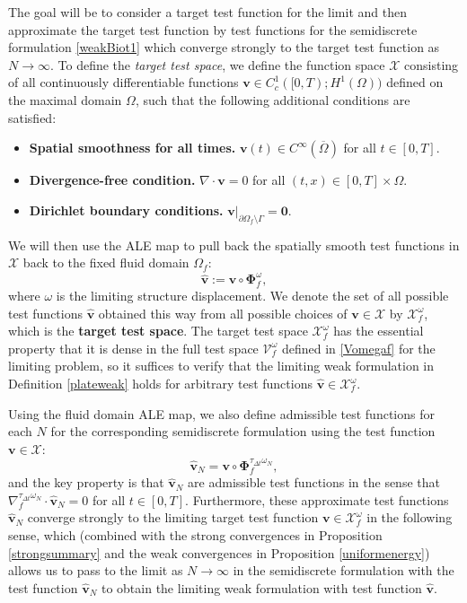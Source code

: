 \documentclass[11pt]{article}
\newcommand{\bd}{\boldsymbol}
\theoremstyle{definition}
\begin{document}
The goal will be to consider a target test function for the limit and then approximate the target test function by test functions for the semidiscrete formulation \eqref{weakBiot1} which converge strongly to the target test function as $N \to \infty$. To define the \textit{target test space}, we define the function space $\mathcal{X}$ consisting of all continuously differentiable functions $\bd{v} \in C^{1}_{c}([0, T); H^{1}(\Omega))$ defined on the maximal domain $\Omega$, such that the following additional conditions are satisfied:
\begin{itemize}
\item \textbf{Spatial smoothness for all times.} $\bd{v}(t) \in C^{\infty}(\overline{\Omega})$ for all $t \in [0, T]$.
\item \textbf{Divergence-free condition.} $\nabla \cdot \bd{v} = 0$ for all $(t, x) \in [0, T] \times \Omega$.
\item \textbf{Dirichlet boundary conditions.} $\bd{v}|_{\partial \Omega_{f} \setminus \Gamma} = \bd{0}$. 
\end{itemize}
We will then use the ALE map to pull back the spatially smooth test functions in $\mathcal{X}$ back to the fixed fluid domain $\Omega_{f}$:
\begin{equation*}
\hat{\bd{v}} := \bd{v} \circ \bd{\Phi}^{\omega}_{f},
\end{equation*}
where $\omega$ is the limiting structure displacement. We denote the set of all possible test functions $\hat{\bd{v}}$ obtained this way from all possible choices of $\bd{v} \in \mathcal{X}$ by $\mathcal{X}^{\omega}_{f}$, which is the \textbf{target test space}. The target test space $\mathcal{X}^{\omega}_{f}$ has the essential property that it is dense in the full test space $\mathcal{V}^{\omega}_{f}$ defined in \eqref{Vomegaf} for the limiting problem, so it suffices to verify that the limiting weak formulation in Definition \ref{plateweak} holds for arbitrary test functions $\hat{\bd{v}} \in \mathcal{X}^{\omega}_{f}$. 

Using the fluid domain ALE map, we also define admissible test functions for each $N$ for the corresponding semidiscrete formulation using the test function $\bd{v} \in \mathcal{X}$:
\begin{equation}\label{hatvN}
\hat{\bd{v}}_{N} = \bd{v} \circ \bd{\Phi}^{\tau_{\Delta t} \omega_{N}}_{f},
\end{equation}
and the key property is that $\hat{\bd{v}}_{N}$ are admissible test functions in the sense that $\nabla^{\tau_{\Delta t} \omega_{N}}_{f} \cdot \hat{\bd{v}}_{N} = 0$ for all $t \in [0, T]$. Furthermore, these approximate test functions $\hat{\bd{v}}_{N}$ converge strongly to the limiting target test function $\bd{v} \in \mathcal{X}^{\omega}_{f}$ in the following sense, which (combined with the strong convergences in Proposition \ref{strongsummary} and the weak convergences in Proposition \ref{uniformenergy}) allows us to pass to the limit as $N \to \infty$ in the semidiscrete formulation with the test function $\hat{\bd{v}}_{N}$ to obtain the limiting weak formulation with test function $\hat{\bd{v}}$. 
\end{document}
